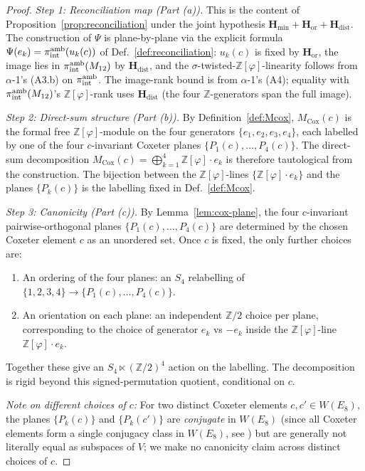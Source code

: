 \documentclass[11pt, a4paper]{amsart}
\theoremstyle{definition}
\newcommand{\Z}{\mathbb{Z}}
\newcommand{\Hmin}{\mathbf{H}_{\min}}
\newcommand{\Hor}{\mathbf{H}_{\mathrm{or}}}
\newcommand{\Hdist}{\mathbf{H}_{\mathrm{dist}}}
\newcommand{\Ophi}{\mathbb{Z}[\varphi]}
\newcommand{\Mcox}{M_{\mathrm{Cox}}}
\newcommand{\Mtw}{M_{12}}
\begin{document}
\begin{proof}
\emph{Step 1: Reconciliation map (Part (a)).}
This is the content of Proposition~\ref{prop:reconciliation}
under the joint hypothesis $\Hmin + \Hor + \Hdist$. The
construction of $\Psi$ is plane-by-plane via the explicit
formula $\Psi(e_k) = \pi_{\rm int}^{\rm amb}(u_k(c))$ of
Def.~\ref{def:reconciliation}: $u_k(c)$ is fixed by $\Hor$,
the image lies in $\pi_{\rm int}^{\rm amb}(\Mtw)$ by
$\Hdist$, and the $\sigma$-twisted-$\Ophi$-linearity follows
from $\alpha$-1's (A3.b) on $\pi_{\rm int}^{\rm amb}$. The
image-rank bound is from $\alpha$-1's (A4); equality with
$\pi_{\rm int}^{\rm amb}(\Mtw)$'s $\Ophi$-rank uses
$\Hdist$ (the four $\Z$-generators span the full image).

\emph{Step 2: Direct-sum structure (Part (b)).}
By Definition~\ref{def:Mcox}, $\Mcox(c)$ is the formal free
$\Ophi$-module on the four generators $\{e_1, e_2, e_3,
e_4\}$, each labelled by one of the four $c$-invariant
Coxeter planes $\{P_1(c), \ldots, P_4(c)\}$. The direct-sum
decomposition $\Mcox(c) = \bigoplus_{k=1}^{4} \Ophi \cdot
e_k$ is therefore tautological from the construction. The
bijection between the $\Ophi$-lines $\{\Ophi \cdot e_k\}$
and the planes $\{P_k(c)\}$ is the labelling fixed in
Def.~\ref{def:Mcox}.

\emph{Step 3: Canonicity (Part (c)).}
By Lemma~\ref{lem:cox-plane}, the four $c$-invariant
pairwise-orthogonal planes $\{P_1(c), \ldots, P_4(c)\}$ are
determined by the chosen Coxeter element $c$ as an unordered
set. Once $c$ is fixed, the only further choices are:
\begin{enumerate}
\item[(i)] An ordering of the four planes: an $S_4$
  relabelling of $\{1, 2, 3, 4\} \to \{P_1(c), \ldots,
  P_4(c)\}$.
\item[(ii)] An orientation on each plane: an independent
  $\Z/2$ choice per plane, corresponding to the choice of
  generator $e_k$ vs $-e_k$ inside the $\Ophi$-line $\Ophi
  \cdot e_k$.
\end{enumerate}
Together these give an $S_4 \ltimes (\Z/2)^4$ action on
the labelling. The decomposition is rigid beyond this
signed-permutation quotient, conditional on $c$.

\emph{Note on different choices of $c$:} For two distinct
Coxeter elements $c, c' \in W(E_8)$, the planes
$\{P_k(c)\}$ and $\{P_k(c')\}$ are \emph{conjugate} in
$W(E_8)$ (since all Coxeter elements form a single
conjugacy class in $W(E_8)$, see
\cite[\S 3.18]{Humphreys}) but are generally not literally
equal as subspaces of $V$; we make no canonicity claim
across distinct choices of $c$.
\end{proof}
\end{document}
